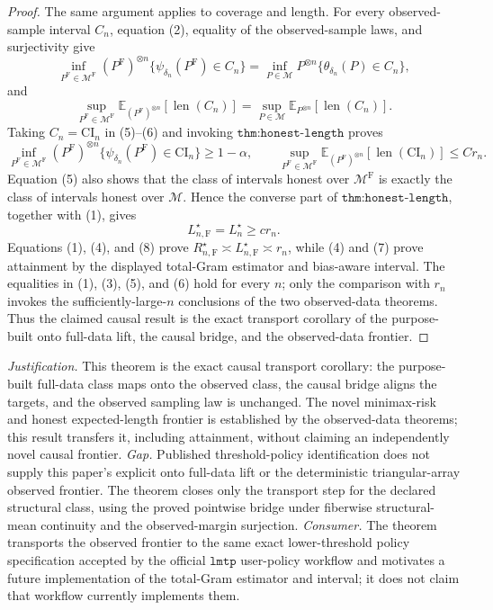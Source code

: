 \documentclass{article}
\begin{document}
\begin{proof}
The same argument applies to coverage and length.  For every observed-sample interval \(C_n\), equation (2), equality of the observed-sample laws, and surjectivity give
\[
 \inf_{P^{\mathrm F}\in\mathcal M^{\mathrm F}}
 (P^{\mathrm F})^{\otimes n}
 \{\psi_{\delta_n}(P^{\mathrm F})\in C_n\}
 =
 \inf_{P\in\mathcal M}
 P^{\otimes n}\{\theta_{\delta_n}(P)\in C_n\}, \tag{5}
\]
and
\[
 \sup_{P^{\mathrm F}\in\mathcal M^{\mathrm F}}
 \mathbb E_{(P^{\mathrm F})^{\otimes n}}[\operatorname{len}(C_n)]
 =
 \sup_{P\in\mathcal M}
 \mathbb E_{P^{\otimes n}}[\operatorname{len}(C_n)]. \tag{6}
\]
Taking \(C_n=\mathrm{CI}_n\) in (5)--(6) and invoking \(\texttt{thm:honest-length}\) proves
\[
 \inf_{P^{\mathrm F}\in\mathcal M^{\mathrm F}}
 (P^{\mathrm F})^{\otimes n}
 \{\psi_{\delta_n}(P^{\mathrm F})\in\mathrm{CI}_n\}
 \geq1-\alpha,
 \qquad
 \sup_{P^{\mathrm F}\in\mathcal M^{\mathrm F}}
 \mathbb E_{(P^{\mathrm F})^{\otimes n}}
 [\operatorname{len}(\mathrm{CI}_n)]
 \leq C r_n. \tag{7}
\]
Equation (5) also shows that the class of intervals honest over \(\mathcal M^{\mathrm F}\) is exactly the class of intervals honest over \(\mathcal M\).  Hence the converse part of \(\texttt{thm:honest-length}\), together with (1), gives
\[
 L_{n,\mathrm F}^\star=L_n^\star\geq c r_n. \tag{8}
\]
Equations (1), (4), and (8) prove \(R_{n,\mathrm F}^\star\asymp L_{n,\mathrm F}^\star\asymp r_n\), while (4) and (7) prove attainment by the displayed total-Gram estimator and bias-aware interval.  The equalities in (1), (3), (5), and (6) hold for every \(n\); only the comparison with \(r_n\) invokes the sufficiently-large-\(n\) conclusions of the two observed-data theorems.  Thus the claimed causal result is the exact transport corollary of the purpose-built onto full-data lift, the causal bridge, and the observed-data frontier.
\end{proof}
\par\smallskip\noindent \textit{Justification.} This theorem is the exact causal transport corollary: the purpose-built full-data class maps onto the observed class, the causal bridge aligns the targets, and the observed sampling law is unchanged. The novel minimax-risk and honest expected-length frontier is established by the observed-data theorems; this result transfers it, including attainment, without claiming an independently novel causal frontier. \textit{Gap.} Published threshold-policy identification does not supply this paper's explicit onto full-data lift or the deterministic triangular-array observed frontier. The theorem closes only the transport step for the declared structural class, using the proved pointwise bridge under fiberwise structural-mean continuity and the observed-margin surjection. \textit{Consumer.} The theorem transports the observed frontier to the same exact lower-threshold policy specification accepted by the official \(\texttt{lmtp}\) user-policy workflow and motivates a future implementation of the total-Gram estimator and interval; it does not claim that workflow currently implements them.
\end{document}
